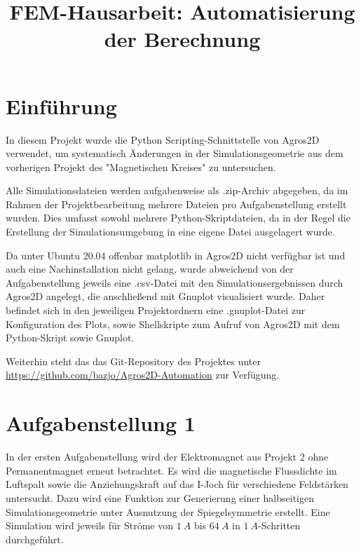 \documentclass[conference,a4paper,twoside]{IEEEtran}
\begin{document}
\title{FEM-Hausarbeit: Automatisierung der Berechnung}

\author{
}

\maketitle


\section{Einführung}
In diesem Projekt wurde die Python Scripting-Schnittstelle von Agros2D verwendet, um systematisch Änderungen in der Simulationsgeometrie aus dem vorherigen Projekt des "Magnetischen Kreises" zu untersuchen.

Alle Simulationsdateien werden aufgabenweise als .zip-Archiv abgegeben, da im Rahmen der Projektbearbeitung mehrere Dateien pro Aufgabenstellung erstellt wurden. Dies umfasst sowohl mehrere Python-Skriptdateien, da in der Regel die Erstellung der Simulationsumgebung in eine eigene Datei ausgelagert wurde.

Da unter Ubuntu 20.04 offenbar matplotlib in Agros2D nicht verfügbar ist und auch eine Nachinstallation nicht gelang, wurde abweichend von der Aufgabenstellung jeweils eine .csv-Datei mit den Simulationsergebnissen durch Agros2D angelegt, die anschließend mit Gnuplot visualisiert wurde. Daher befindet sich in den jeweiligen Projektordnern eine .gnuplot-Datei zur Konfiguration des Plots, sowie Shellskripte zum Aufruf von Agros2D mit dem Python-Skript sowie Gnuplot.

Weiterhin steht das das Git-Repository des Projektes unter \url{https://github.com/bazjo/Agros2D-Automation} zur Verfügung.

\section{Aufgabenstellung 1}
In der ersten Aufgabenstellung wird der Elektromagnet aus Projekt 2 ohne Permanentmagnet erneut betrachtet. Es wird die magnetische Flussdichte im Luftspalt sowie die Anziehungskraft auf das I-Joch für verschiedene Feldstärken untersucht. Dazu wird eine Funktion zur Generierung einer halbseitigen Simulationsgeometrie unter Ausnutzung der Spiegelsymmetrie erstellt. Eine Simulation wird jeweils für Ströme von $1\ A$ bis $64\ A$ in $1\ A$-Schritten durchgeführt.
\end{document}
